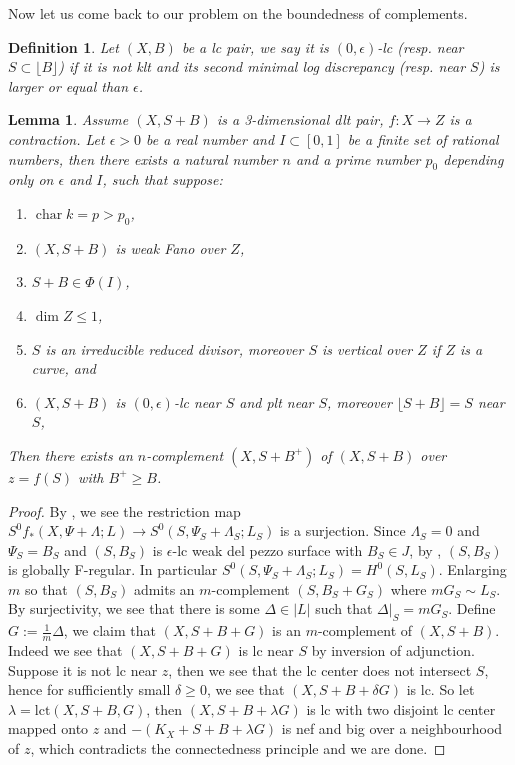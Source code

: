\documentclass[letterpaper,reqno,12pt]{amsart}
\DeclareMathOperator{\chara}{char}
\numberwithin{equation}{section}
\theoremstyle{plain}
\newtheorem{lemma}[theorem]{Lemma}
\newtheorem{definition}{Definition}[section]
\begin{document}
Now let us come back to our problem on the boundedness of complements.
\begin{definition}
    Let $(X,B)$ be a lc pair, we say it is $(0,\epsilon)$-lc (resp. near $S\subset \lfloor B\rfloor$) if it is not klt and its second minimal log discrepancy (resp. near $S$) is larger or equal than $\epsilon$.
\end{definition}
\begin{lemma}
\label{relacomp3}
     Assume $(X,S+B)$ is a 3-dimensional dlt pair, $f:X\to Z$ is a contraction. Let $\epsilon>0$ be a real number and $I\subset[0,1]$ be a finite set of rational numbers, then there exists a natural number $n$ and a prime number $p_0$ depending only on $\epsilon$ and $I$, such that suppose:
     \begin{enumerate}
        \item $\chara k=p>p_0$,
         \item $(X,S+B)$ is weak Fano over $Z$,
         \item $S+B\in \Phi(I)$,
         \item $\dim Z\leq 1$,
         \item $S$ is an irreducible reduced divisor, moreover $S$ is vertical over $Z$ if $Z$ is a curve, and
         \item $(X,S+B)$ is $(0,\epsilon)$-lc near $S$ and plt near $S$, moreover $\lfloor S+B\rfloor= S$ near $S$,
     \end{enumerate}  
     Then there exists an $n$-complement $(X,S+B^+)$ of $(X,S+B)$ over $z=f(S)$ with $B^+\geq B$.
\end{lemma}
\begin{proof}
    By \cite[2.18]{threedimmmp}, we see the restriction map $S^0f_*(X,\Psi+\Lambda;L)\to S^0(S,\Psi_S+\Lambda_S; L_S)$ is a surjection. Since $\Lambda_S=0$ and $\Psi_S=B_S$ and $(S,B_S)$ is $\epsilon$-lc weak del pezzo surface with $B_S\in J$, by , $(S,B_S)$ is globally F-regular. In particular $S^0(S,\Psi_S+\Lambda_S; L_S)=H^0(S,L_S)$. Enlarging $m$ so that $(S,B_S)$ admits an $m$-complement $(S, B_S+G_S)$ where $mG_S\sim L_S$. By surjectivity, we see that there is some $\Delta\in |L|$ such that $\Delta|_S=mG_S$. Define $G:=\frac{1}{m}\Delta$, we claim that $(X,S+B+G)$ is an $m$-complement of $(X,S+B)$. Indeed we see that $(X,S+B+G)$ is lc near $S$ by inversion of adjunction.  Suppose it is not lc near $z$, then we see that the lc center does not intersect $S$, hence for sufficiently small $\delta\geq 0$, we see that $(X,S+B+\delta G)$ is lc. So let $\lambda=\text{lct}(X,S+B,G)$, then $(X,S+B+\lambda G)$ is lc with two disjoint lc center mapped onto $z$ and $-(K_X+S+B+\lambda G)$ is nef and big over a neighbourhood of $z$, which contradicts the connectedness principle and we are done.
\end{proof}
\end{document}
